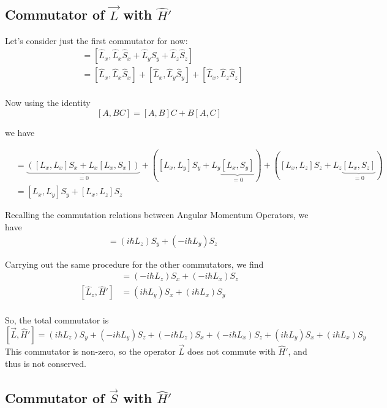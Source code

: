 \documentclass{article}
\begin{document}
\subsection*{Commutator of $\vec{L}$ with $\hat{H}'$}
Let's consider just the first commutator for now:
\begin{align*}
  [\hat{L}_x, \hat{H}']  &= [\hat{L}_x, \hat{L}_x\hat{S}_x + \hat{L}_y\hat{S}_y + \hat{L}_z\hat{S}_z] \\
  &= [\hat{L}_x, \hat{L}_x\hat{S}_x] + [\hat{L}_x, \hat{L}_y\hat{S}_y] + [\hat{L}_x, \hat{L}_z\hat{S}_z] \\
\end{align*}

Now using the identity
\[ [A, BC] = [A, B]C + B[A, C] \]

we have 

\begin{align*}
  [\hat{L}_x, \hat{H}']  &= \underbrace{([L_x, L_x]S_x + L_x[L_x, S_x])}_{= 0} + \left( [L_x, L_y]S_y + L_y\underbrace{[L_x, S_y]}_{ = 0} \right) +  \left( [L_x, L_z]S_z + L_z\underbrace{[L_x, S_z]}_{ = 0} \right) \\
  &= [L_x, L_y]S_y + [L_x, L_z]S_z 
\end{align*}

Recalling the commutation relations between Angular Momentum Operators, we have 
\begin{align*}
  [\hat{L}_x, \hat{H}']  &= (i\hbar L_z)S_y  + (-i\hbar L_y)S_z
\end{align*}

Carrying out the same procedure for the other commutators, we find 
\begin{align*}
  [\hat{L}_y, \hat{H}']  &= (-i\hbar L_z)S_x  + (-i\hbar L_x)S_z \\
  [\hat{L}_z, \hat{H}']  &= (i\hbar L_y)S_x  + (i\hbar L_x)S_y \\  
\end{align*}

So, the total commutator is 
\[ \boxed{ [\vec{L}, \hat{H}'] = (i\hbar L_z)S_y  + (-i\hbar L_y)S_z + (-i\hbar L_z)S_x  + (-i\hbar L_x)S_z +  (i\hbar L_y)S_x  + (i\hbar L_x)S_y } \]
This commutator is non-zero, so the operator $\vec{L}$ does not commute with $\hat{H}'$, and thus is not conserved.

\vskip 0.5cm
\subsection*{Commutator of $\vec{S}$ with $\hat{H}'$}
\end{document}
